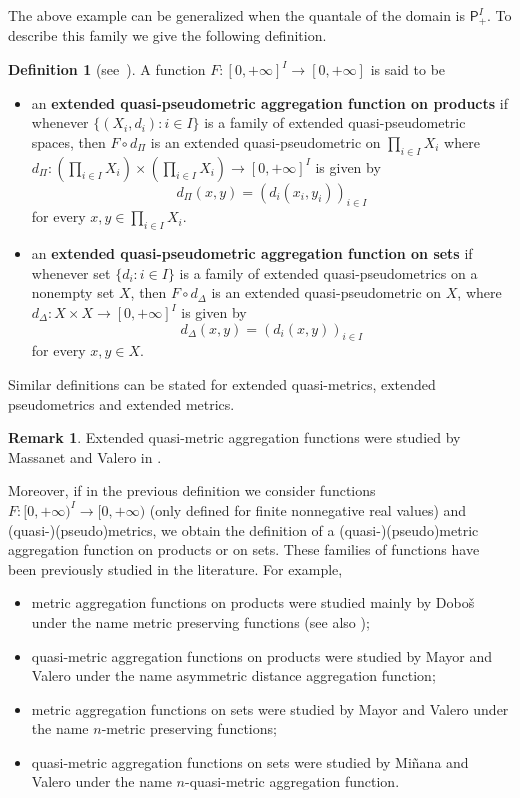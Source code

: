 \documentclass[11pt,a4paper]{amsart}
\theoremstyle{definition}
\newtheorem{definition}[theorem]{Definition}
\newtheorem{remark}[theorem]{Remark}
\begin{document}
	The above example can be generalized when the quantale of the domain is $\mathsf{P}_+^I$. To describe this family we give the following definition.
	
	\begin{definition}[\mbox{see \cite[Definition 1]{MassaVale13}}]\label{def:eqpmaf}
		A function $F: [0,+\infty]^I\rightarrow [0,+\infty]$ is said to be 
		\begin{itemize}
			\item an \textbf{extended quasi-pseudometric aggregation function on products} if whenever $\big\{(X_i,d_i):i\in I\big\}$ is a family of extended quasi-pseudometric spaces, then $F\circ d_\Pi$ is an extended quasi-pseudometric on $\prod_{i\in I} X_i$ where $d_\Pi:\left(\prod_{i\in I} X_i\right)\times \left(\prod_{i\in I} X_i\right)\to [0,+\infty]^I$ is given by
			$$d_\Pi(x,y)=(d_i(x_i,y_i))_{i\in I}$$
			for every $x,y\in \prod_{i\in I} X_i.$
			\item an \textbf{extended quasi-pseudometric aggregation function on sets} if whenever set $\{d_{i}:i \in I\}$ is a family of extended quasi-pseudometrics on a nonempty set $X$, then $F \circ d_\Delta$ is an extended quasi-pseudometric on $X$, where $d_\Delta: X \times X \rightarrow [0,+\infty]^{I}$ is given by $$d_\Delta(x,y)=(d_{i}(x,y))_{i \in I}$$
			for every $x,y \in X.$
		\end{itemize}
		
		Similar definitions can be stated for extended quasi-metrics, extended pseudometrics and extended metrics.
	\end{definition}
	
	\begin{remark}\label{rem:qpmaf}
		Extended quasi-metric aggregation functions were studied by Massanet and Valero in \cite{MassaVale13}.
		
		Moreover, if in the previous definition we consider  functions  $F:[0,+\infty)^I\rightarrow [0,+\infty)$ (only defined for finite nonnegative real values) and (quasi-)(pseudo)\-metrics, we obtain the definition of a (quasi-)(pseudo)metric aggregation function on products or on sets. These families of functions have been previously studied in the literature. For example,
		\begin{itemize}
			\item metric aggregation functions on products were studied mainly by Dobo\v{s} \cite{Dobos98} under the name metric preserving functions (see also \cite{Corazza99}); 
			\item quasi-metric aggregation functions on products were studied by Mayor and Valero  \cite{MayorVale10} under the name asymmetric distance aggregation function;
			\item metric aggregation functions on sets were studied by Mayor and Valero  \cite{MayorVale19} under the name $n$-metric preserving functions; 
			\item quasi-metric aggregation functions on sets were studied by Mi\~nana and Valero  \cite{MinyaVale19} under the name $n$-quasi-metric aggregation function.
		\end{itemize}
		
	\end{remark}
	
\end{document}
